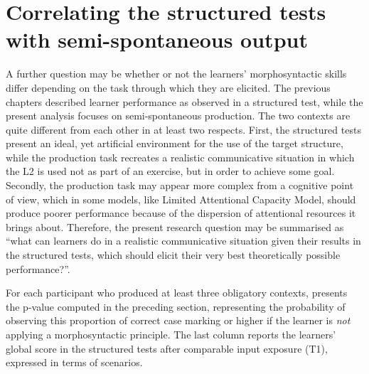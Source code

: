 \section{Correlating the structured tests with semi-spontaneous output}\label{sec:07:4}

A further question may be whether or not the learners’ morphosyntactic skills differ depending on the task through which they are elicited. The previous chapters described learner performance as observed in a structured test, while the present analysis focuses on semi-spontaneous production. The two contexts are quite different from each other in at least two respects. First, the structured tests present an ideal, yet artificial environment for the use of the target structure, while the production task recreates a realistic communicative situation in which the L2 is used not as part of an exercise, but in order to achieve some goal. Secondly, the production task may appear more complex from a cognitive point of view, which in some models, like  Limited Attentional Capacity Model, should produce poorer performance because of the dispersion of attentional resources it brings about. Therefore, the present research question may be summarised as “what can learners do in a realistic communicative situation given their results in the structured tests, which should elicit their very best theoretically possible performance?”. 

\largerpage
For each participant who produced at least three obligatory contexts,  presents the p-value computed in the preceding section, representing the probability of observing this proportion of correct case marking or higher if the learner is \textit{not} applying a morphosyntactic principle. The last column reports the learners’ global score in the structured tests after comparable input exposure (T1), expressed in terms of scenarios.

